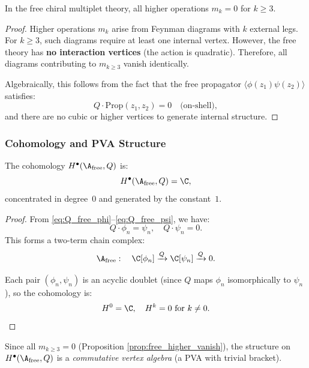 \begin{proposition}[All $m_{k \geq 3} = 0$ for Free Theory]
In the free chiral multiplet theory, all higher operations $m_k = 0$ for $k \geq 3$.
\end{proposition}

\begin{proof}
Higher operations $m_k$ arise from Feynman diagrams with $k$ external legs. For $k \geq 3$, such diagrams require at least one internal vertex. However, the free theory has \textbf{no interaction vertices} (the action is quadratic). Therefore, all diagrams contributing to $m_{k \geq 3}$ vanish identically.

Algebraically, this follows from the fact that the free propagator $\langle \phi(z_1)\psi(z_2)\rangle$ satisfies:
\begin{equation}
Q \cdot \text{Prop}(z_1, z_2) = 0 \quad \text{(on-shell)},
\end{equation}
and there are no cubic or higher vertices to generate internal structure.
\end{proof}

\subsubsection{Cohomology and PVA Structure}

\begin{proposition}
The cohomology $H^\bullet(\A_{\text{free}}, Q)$ is:
\begin{equation}
H^\bullet(\A_{\text{free}}, Q) = \C,
\end{equation}
concentrated in degree~$0$ and generated by the constant~$1$.
\end{proposition}

\begin{proof}
From \eqref{eq:Q_free_phi}--\eqref{eq:Q_free_psi}, we have:
\begin{equation}
Q \cdot \phi_n = \psi_n, \quad Q \cdot \psi_n = 0.
\end{equation}
This forms a two-term chain complex:
\begin{equation}
\A_{\text{free}} : \quad \C[\phi_n] \xrightarrow{Q} \C[\psi_n] \xrightarrow{Q} 0.
\end{equation}

Each pair $(\phi_n, \psi_n)$ is an acyclic doublet (since $Q$ maps $\phi_n$ isomorphically to $\psi_n$), so the cohomology is:
\begin{equation}
H^0 = \C, \quad H^{k} = 0 \text{ for } k \neq 0.
\end{equation}
\end{proof}
Since all $m_{k \geq 3} = 0$ (Proposition \ref{prop:free_higher_vanish}), the structure on $H^\bullet(\A_{\text{free}}, Q)$ is a \emph{commutative vertex algebra} (a PVA with trivial bracket).

